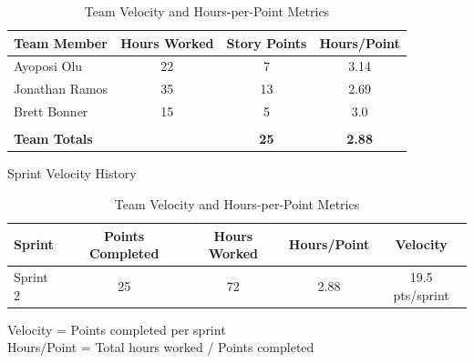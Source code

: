 \begin{table}[h]
\centering
\caption{Team Velocity and Hours-per-Point Metrics}
\begin{tabular}{|l|c|c|c|}
\hline
\textbf{Team Member} & \textbf{Hours Worked} & \textbf{Story Points} & \textbf{Hours/Point} \\
\hline
Ayoposi Olu & 22 & 7 & 3.14 \\
\hline
Jonathan Ramos & 35 & 13 & 2.69 \\
\hline
Brett Bonner & 15 & 5 & 3.0 \\
\hline
\multicolumn{4}{|c|}{} \\
\hline
\multicolumn{2}{|l|}{\textbf{Team Totals }} & \textbf{25} & \textbf{2.88} \\
\hline
\end{tabular}

\begin{center}
\small{Sprint Velocity History}
\end{center}
\begin{tabular}{|l|c|c|c|c|}
\hline
\textbf{Sprint} & \textbf{Points Completed} & \textbf{Hours Worked} & \textbf{Hours/Point} & \textbf{Velocity} \\
\hline
Sprint 2 & 25 & 72 & 2.88 & 19.5 pts/sprint \\
\hline
\end{tabular}

\vspace{0.5cm}
\begin{center}
\small{Velocity = Points completed per sprint \\
Hours/Point = Total hours worked / Points completed}
\end{center}
\end{table}

